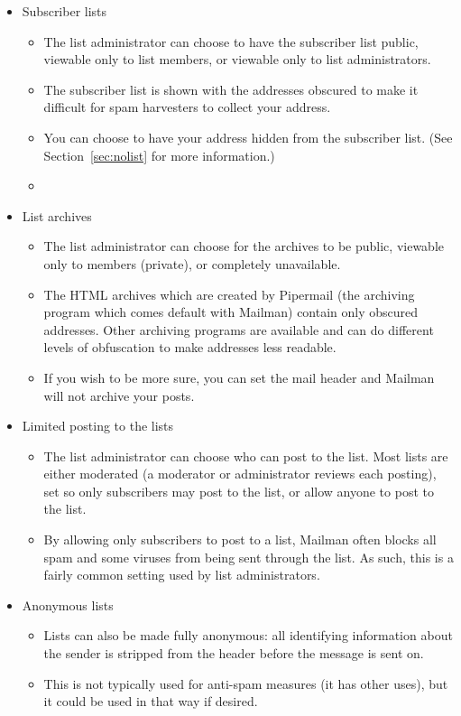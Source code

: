 \documentclass{howto}
\begin{document}
\begin{itemize}
	\item Subscriber lists
		\begin{itemize}
			\item The list administrator can choose to have the subscriber list
			public, viewable only to list members, or viewable only to list 
			administrators.
			\item The subscriber list is shown with the addresses obscured to
			make it difficult for spam harvesters to collect your address.
			\item You can choose to have your address hidden from the subscriber
			list.  (See Section~\ref{sec:nolist} for more information.) 
			\item {}
		\end{itemize}

	\item List archives
		\begin{itemize}
			\item The list administrator can choose for the archives to be public,
			viewable only to members (private), or completely unavailable.
			\item The HTML archives which are created by Pipermail (the 
			archiving program which comes default with Mailman) contain only
			obscured addresses.  Other archiving programs are available and can
			do different levels of obfuscation to make addresses less readable.
			\item If you wish to be more sure, you can set the mail header
			 and Mailman will not archive your posts.
		\end{itemize}

	\item Limited posting to the lists
		\begin{itemize}
			\item The list administrator can choose who can post to the list.
			Most lists are either moderated (a moderator or administrator
			reviews each posting), set so only subscribers may post to the list,
			or allow anyone to post to the list.
			\item By allowing only subscribers to post to a list, Mailman often 
			blocks all spam and some viruses from being sent through the list.
			As such, this is a fairly common setting used by list administrators.
		\end{itemize}

	\item Anonymous lists
		\begin{itemize}
			\item Lists can also be made fully anonymous: all identifying
			information about the sender is stripped from the header before the
			message is sent on.  
			\item This is not typically used for anti-spam measures (it has
			other uses), but it could be used in that way if desired.
		\end{itemize}
\end{itemize}
\end{document}
